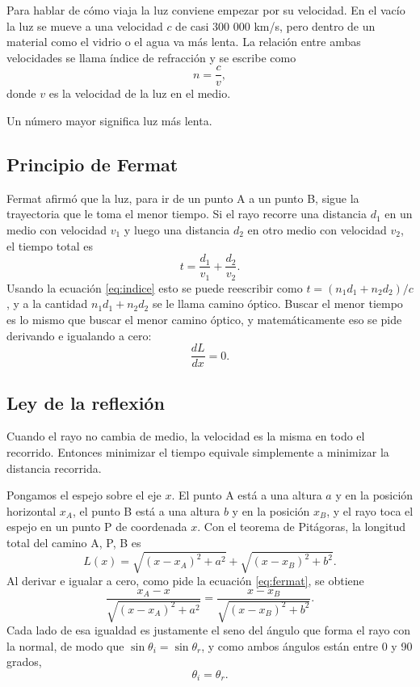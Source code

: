 Para hablar de cómo viaja la luz conviene empezar por su velocidad. En el vacío la luz se mueve a una velocidad $c$ de casi 300 000 km/s, pero dentro de un material como el vidrio o el agua va más lenta. La relación entre ambas velocidades se llama índice de refracción y se escribe como
\begin{equation}
n = \frac{c}{v},
\label{eq:indice}
\end{equation}
donde $v$ es la velocidad de la luz en el medio.

Un número mayor significa luz más lenta.

\subsection{Principio de Fermat}
Fermat afirmó que la luz, para ir de un punto A a un punto B, sigue la trayectoria que le toma el menor tiempo. Si el rayo recorre una distancia $d_1$ en un medio con velocidad $v_1$ y luego una distancia $d_2$ en otro medio con velocidad $v_2$, el tiempo total es
\begin{equation}
t = \frac{d_1}{v_1} + \frac{d_2}{v_2}.
\label{eq:tiempo}
\end{equation}
Usando la ecuación \eqref{eq:indice} esto se puede reescribir como $t = (n_1 d_1 + n_2 d_2)/c$, y a la cantidad $n_1 d_1 + n_2 d_2$ se le llama camino óptico. Buscar el menor tiempo es lo mismo que buscar el menor camino óptico, y matemáticamente eso se pide derivando e igualando a cero:
\begin{equation}
\frac{dL}{dx} = 0 .
\label{eq:fermat}
\end{equation}

\subsection{Ley de la reflexión}
Cuando el rayo no cambia de medio, la velocidad es la misma en todo el recorrido. Entonces minimizar el tiempo equivale simplemente a minimizar la distancia recorrida.

Pongamos el espejo sobre el eje $x$. El punto A está a una altura $a$ y en la posición horizontal $x_A$, el punto B está a una altura $b$ y en la posición $x_B$, y el rayo toca el espejo en un punto P de coordenada $x$. Con el teorema de Pitágoras, la longitud total del camino A, P, B es
\begin{equation}
L(x) = \sqrt{(x - x_A)^2 + a^2} + \sqrt{(x - x_B)^2 + b^2}.
\label{eq:longitud}
\end{equation}
Al derivar e igualar a cero, como pide la ecuación \eqref{eq:fermat}, se obtiene
\begin{equation}
\frac{x_A - x}{\sqrt{(x - x_A)^2 + a^2}} = \frac{x - x_B}{\sqrt{(x - x_B)^2 + b^2}}.
\label{eq:derivada}
\end{equation}
Cada lado de esa igualdad es justamente el seno del ángulo que forma el rayo con la normal, de modo que $\sin\theta_i = \sin\theta_r$, y como ambos ángulos están entre 0 y 90 grados,
\begin{equation}
\theta_i = \theta_r .
\label{eq:reflexion}
\end{equation}

